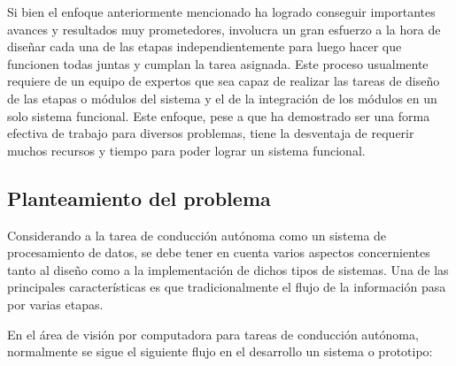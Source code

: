 \documentclass[12pt,letterpaper]{article}
\begin{document}
Si bien el enfoque anteriormente mencionado ha logrado conseguir importantes avances y resultados 
muy prometedores, involucra un gran esfuerzo a la hora de diseñar cada una de las etapas independientemente 
para luego hacer que funcionen todas juntas y cumplan la tarea asignada. Este proceso usualmente requiere 
de un equipo de expertos que sea capaz de realizar las tareas de diseño de las etapas o módulos del sistema 
y el de la integración de los módulos en un solo sistema funcional. Este enfoque, pese a que ha demostrado ser 
una forma efectiva de trabajo para diversos problemas, tiene la desventaja de requerir muchos 
recursos y tiempo para poder lograr un sistema funcional. 


%
\subsection{Planteamiento del problema}

% 

Considerando a la tarea de conducción autónoma como un sistema de procesamiento de datos, se debe tener en 
cuenta varios aspectos concernientes tanto al diseño como a la implementación de dichos tipos de sistemas. Una 
de las principales características es que tradicionalmente el flujo de la información pasa por varias etapas.

En el área de visión por computadora para tareas de conducción autónoma, normalmente se sigue el siguiente flujo en el desarrollo 
un sistema o prototipo:
\end{document}
